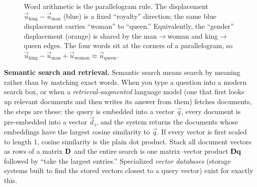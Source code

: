 \begin{figure}[htbp]
\centering
{}
\caption{Word arithmetic is the parallelogram rule. The displacement
$\vec{u}_{\text{king}}-\vec{u}_{\text{man}}$ (blue) is a fixed ``royalty'' direction; the
same blue displacement carries ``woman'' to ``queen.'' Equivalently, the ``gender''
displacement (orange) is shared by the man$\to$woman and king$\to$queen edges. The four
words sit at the corners of a parallelogram, so
$\vec{u}_{\text{king}}-\vec{u}_{\text{man}}+\vec{u}_{\text{woman}}\approx\vec{u}_{\text{queen}}$.}
\label{ch34:fig-wordarith}
\end{figure}

\begin{applicationbox}
\textbf{Semantic search and retrieval.} Semantic search means search by meaning rather
than by matching exact words. When you type a question into a modern search box, or when
a \emph{retrieval-augmented} language model (one that first looks up relevant documents
and then writes its answer from them) fetches documents, the steps are these: the query
is embedded into a vector $\vec{q}$, every document is pre-embedded into a vector
$\vec{d}_i$, and the system returns the documents whose embeddings have the largest
cosine similarity to $\vec{q}$. If every vector is first scaled to length $1$, cosine
similarity is the plain dot product. Stack all document vectors as rows of a matrix
$\mathbf{D}$ and the entire search is one matrix--vector product $\mathbf{D}\mathbf{q}$ followed by
``take the largest entries.'' Specialized \emph{vector databases} (storage systems built to
find the stored vectors closest to a query vector) exist for exactly this.
\end{applicationbox}

